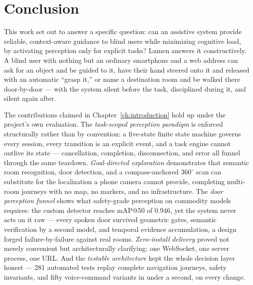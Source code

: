 \chapter{Conclusion}
\label{ch:conclusion}

This work set out to answer a specific question: can an assistive system provide
reliable, context-aware guidance to blind users while minimizing cognitive load, by
activating perception only for explicit tasks? Lumen answers it constructively. A
blind user with nothing but an ordinary smartphone and a web address can ask for an
object and be guided to it, have their hand steered onto it and released with an
automatic ``grasp it,'' or name a destination room and be walked there
door-by-door --- with the system silent before the task, disciplined during it, and
silent again after.

The contributions claimed in Chapter~\ref{ch:introduction} hold up under the
project's own evaluation. The \emph{task-scoped perception paradigm} is enforced
structurally rather than by convention: a five-state finite state machine governs
every session, every transition is an explicit event, and a task engine cannot
outlive its state --- cancellation, completion, disconnection, and error all funnel
through the same teardown. \emph{Goal-directed exploration} demonstrates that
semantic room recognition, door detection, and a compass-anchored $360^\circ$ scan
can substitute for the localization a phone camera cannot provide, completing
multi-room journeys with no map, no markers, and no infrastructure. The
\emph{door perception funnel} shows what safety-grade perception on commodity
models requires: the custom detector reaches mAP@50 of $0.946$, yet the system
never acts on it raw --- every spoken door survived geometric gates, semantic
verification by a second model, and temporal evidence accumulation, a design forged
failure-by-failure against real rooms. \emph{Zero-install delivery} proved not
merely convenient but architecturally clarifying: one WebSocket, one server
process, one URL. And the \emph{testable architecture} kept the whole decision
layer honest --- 281 automated tests replay complete navigation journeys, safety
invariants, and fifty voice-command variants in under a second, on every change.

